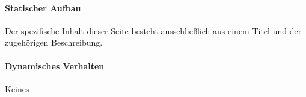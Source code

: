 \paragraph*{Statischer Aufbau}
Der spezifische Inhalt dieser Seite besteht ausschließlich aus einem Titel und der zugehörigen Beschreibung.

\paragraph*{Dynamisches Verhalten}
Keines

\begin{center}
    \captionsetup[figure]{labelformat=empty}
    \captionsetup[figure]{labelformat=default}
\end{center}
